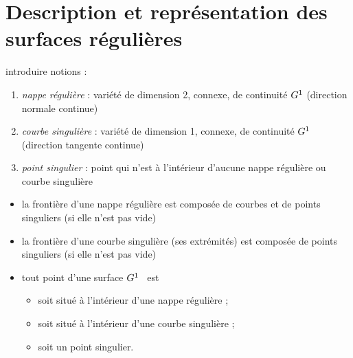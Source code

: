 \section{Description et représentation des surfaces régulières \piecewise}

introduire notions \cite{rossignac1985} : 
\begin{enumerate}
	\item \textit{nappe régulière} : variété de dimension 2, connexe, de continuité $G^{1}$ (direction normale continue)
	\item \textit{courbe singulière} : variété de dimension 1, connexe, de continuité $G^{1}$ (direction tangente continue)
	\item \textit{point singulier} : point qui n'est à l'intérieur d'aucune nappe régulière ou courbe singulière
\end{enumerate}

\begin{itemize}
	\item la frontière d'une nappe régulière est composée de courbes et de points singuliers (si elle n'est pas vide)
	\item la frontière d'une courbe singulière (ses extrémités) est composée de points singuliers (si elle n'est pas vide)
	\item tout point d'une surface $G^{1}$ \piecewise\ est
	\begin{itemize}
		\item soit situé à l'intérieur d'une nappe régulière ;
		\item soit situé à l'intérieur d'une courbe singulière ;
		\item soit un point singulier.
	\end{itemize}
\end{itemize}


